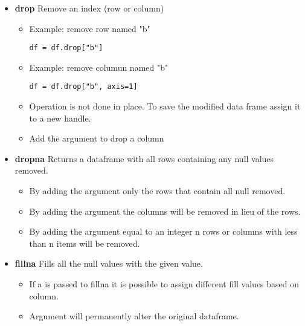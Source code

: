 \begin{itemize}
  \item \textbf{drop} Remove an index (row or column)
    \begin{itemize}

      \item Example: remove row named "b"
\begin{lstlisting}
df = df.drop["b"]
\end{lstlisting}

      \item Example: remove columun named "b"
\begin{lstlisting}
df = df.drop["b", axis=1]
\end{lstlisting}

      \item Operation is not done in place.  To save the modified data frame
        assign it to a new handle.

      \item Add the argument \color{red}{axis=1} to drop a column
    \end{itemize}

  \item \textbf{dropna} Returns a dataframe with all rows containing any null
    values removed.
    \begin{itemize}

      \item By adding the argument {\color{red}{how='all'}} only the rows that
        contain all null removed.

      \item By adding the argument {\color{red}{axis=1}} the columns will be
        removed in lieu of the rows.

      \item By adding the argument {\color{red}{thresh}} equal to an integer n
        rows or columns with less than n items will be removed.
    \end{itemize}

  \item \textbf{fillna} Fills all the null values with the given value.
    \begin{itemize}

      \item If a {\color{red}{dictionary}} is passed to fillna it is possible
        to assign different fill values based on column.

      \item Argument {\color{red}{inplace=True}} will permanently alter the
        original dataframe.
    \end{itemize}


\end{itemize}
